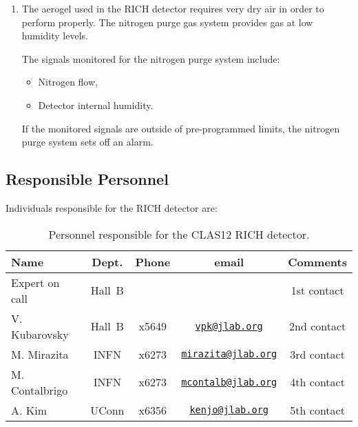 \begin{enumerate}
\item The aerogel used in the RICH detector requires very dry air in order to perform properly. The 
nitrogen purge gas system provides gas  at low humidity levels.

The signals monitored for the nitrogen purge system include:
\begin{itemize}
\item Nitrogen flow,
\item Detector internal humidity.
\end{itemize}
If the monitored signals are outside of pre-programmed limits, the nitrogen purge system sets off 
an alarm.
\end{enumerate}

\subsection{Responsible Personnel}

Individuals responsible for the RICH detector are:

\begin{table}[!htb]
\centering
\begin{tabular}{|l|c|c|c|c|} \hline
Name&Dept.&Phone&email&Comments \\ \hline
Expert on call & Hall~B & & & 1st contact \\ \hline
V. Kubarovsky  & Hall~B&x5649&\href{mailto:vpk@jlab.org}{\nolinkurl{vpk@jlab.org}}&2nd contact \\ \hline
M. Mirazita    & INFN&x6273&\href{mailto:mirazita@jlab.org}{\nolinkurl{mirazita@jlab.org}}& 3rd contact \\ \hline
M. Contalbrigo & INFN&x6273&\href{mailto:mcontalb@jlab.org}{\nolinkurl{mcontalb@jlab.org}}& 4th contact \\ \hline
A. Kim         & UConn &x6356&\href{mailto:kenjo@jlab.org}{\nolinkurl{kenjo@jlab.org}}& 5th contact \\ \hline
 \end{tabular}
\caption{Personnel responsible for the CLAS12 RICH detector.} 
\label{tb:rich}
\end{table}

